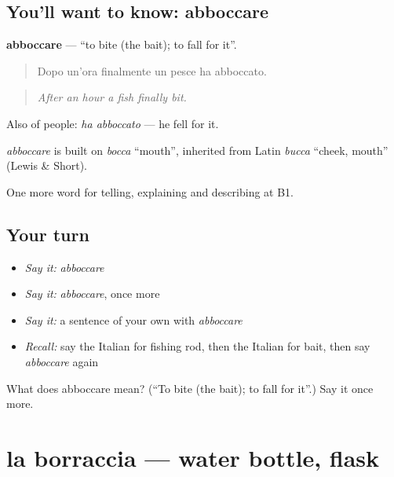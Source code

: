 \subsection*{You'll want to know: abboccare}
\textbf{abboccare} — \textquotedblleft{}to bite (the bait); to fall for it\textquotedblright{}.

\begin{quote}
Dopo un'ora finalmente un pesce ha abboccato.
\end{quote}

\begin{quote}
\emph{After an hour a fish finally bit.}
\end{quote}

Also of people: \emph{ha abboccato} — he fell for it.

\begin{cousinweb}
\emph{abboccare} is built on \emph{bocca} \textquotedblleft{}mouth\textquotedblright{}, inherited from Latin \emph{bucca} \textquotedblleft{}cheek, mouth\textquotedblright{} (Lewis \& Short).
\end{cousinweb}

\begin{grammarlens}[title={What you've built}]
One more word for telling, explaining and describing at B1.
\end{grammarlens}

\subsection*{Your turn}
\begin{itemize}
\raggedright
  \item \emph{Say it:} \emph{abboccare}
  \item \emph{Say it:} \emph{abboccare}, once more
  \item \emph{Say it:} a sentence of your own with \emph{abboccare}
  \item \emph{Recall:} say the Italian for fishing rod, then the Italian for bait, then say \emph{abboccare} again
\end{itemize}

\begin{tcolorbox}[breakable,colback=teal!4,colframe=teal!35!black,title={Before you move on}]
What does abboccare mean? (\textquotedblleft{}To bite (the bait); to fall for it\textquotedblright{}.) Say it once more.
\end{tcolorbox}
\section[la borraccia]{la borraccia — water bottle, flask}

